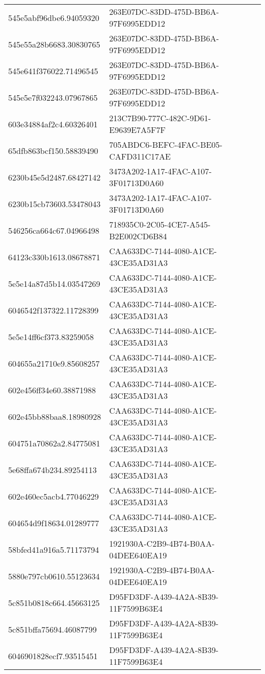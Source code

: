 \begin{tabular}{ll}
545e5abf96dbe6.94059320 & 263E07DC-83DD-475D-BB6A-97F6995EDD12 \\
545e55a28b6683.30830765 & 263E07DC-83DD-475D-BB6A-97F6995EDD12 \\
545e641f376022.71496545 & 263E07DC-83DD-475D-BB6A-97F6995EDD12 \\
545e5e7f032243.07967865 & 263E07DC-83DD-475D-BB6A-97F6995EDD12 \\
603e34884af2c4.60326401 & 213C7B90-777C-482C-9D61-E9639E7A5F7F \\
65dfb863bcf150.58839490 & 705ABDC6-BEFC-4FAC-BE05-CAFD311C17AE \\
6230b45e5d2487.68427142 & 3473A202-1A17-4FAC-A107-3F01713D0A60 \\
6230b15cb73603.53478043 & 3473A202-1A17-4FAC-A107-3F01713D0A60 \\
546256ca664c67.04966498 & 718935C0-2C05-4CE7-A545-B2E002CD6B84 \\
64123c330b1613.08678871 & CAA633DC-7144-4080-A1CE-43CE35AD31A3 \\
5e5e14a87d5b14.03547269 & CAA633DC-7144-4080-A1CE-43CE35AD31A3 \\
6046542f137322.11728399 & CAA633DC-7144-4080-A1CE-43CE35AD31A3 \\
5e5e14ff6cf373.83259058 & CAA633DC-7144-4080-A1CE-43CE35AD31A3 \\
604655a21710e9.85608257 & CAA633DC-7144-4080-A1CE-43CE35AD31A3 \\
602e456ff34e60.38871988 & CAA633DC-7144-4080-A1CE-43CE35AD31A3 \\
602e45bb88baa8.18980928 & CAA633DC-7144-4080-A1CE-43CE35AD31A3 \\
604751a70862a2.84775081 & CAA633DC-7144-4080-A1CE-43CE35AD31A3 \\
5e68ffa674b234.89254113 & CAA633DC-7144-4080-A1CE-43CE35AD31A3 \\
602e460ec5acb4.77046229 & CAA633DC-7144-4080-A1CE-43CE35AD31A3 \\
604654d9f18634.01289777 & CAA633DC-7144-4080-A1CE-43CE35AD31A3 \\
58bfed41a916a5.71173794 & 1921930A-C2B9-4B74-B0AA-04DEE640EA19 \\
5880e797cb0610.55123634 & 1921930A-C2B9-4B74-B0AA-04DEE640EA19 \\
5c851b0818c664.45663125 & D95FD3DF-A439-4A2A-8B39-11F7599B63E4 \\
5c851bffa75694.46087799 & D95FD3DF-A439-4A2A-8B39-11F7599B63E4 \\
6046901828ecf7.93515451 & D95FD3DF-A439-4A2A-8B39-11F7599B63E4 \\

\end{tabular}
